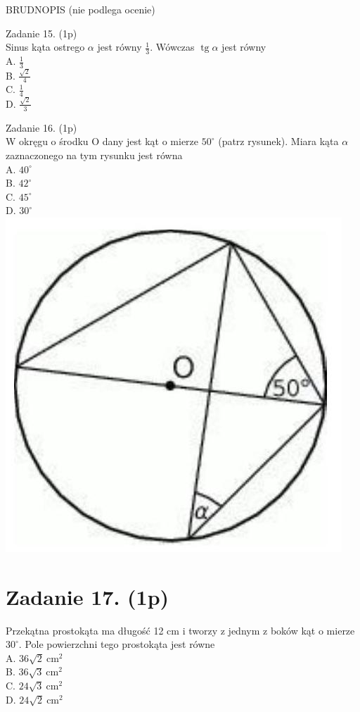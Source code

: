 \documentclass[10pt]{article}
\begin{document}
BRUDNOPIS (nie podlega ocenie)

Zadanie 15. (1p)\\
Sinus kąta ostrego \(\alpha\) jest równy \(\frac{1}{3}\). Wówczas \(\operatorname{tg} \alpha\) jest równy\\
A. \(\frac{1}{3}\)\\
B. \(\frac{\sqrt{2}}{4}\)\\
C. \(\frac{1}{4}\)\\
D. \(\frac{\sqrt{2}}{3}\)

Zadanie 16. (1p)\\
W okręgu o środku O dany jest kąt o mierze \(50^{\circ}\) (patrz rysunek). Miara kąta \(\alpha\) zaznaczonego na tym rysunku jest równa\\
A. \(40^{\circ}\)\\
B. \(42^{\circ}\)\\
C. \(45^{\circ}\)\\
D. \(30^{\circ}\)\\
\includegraphics[max width=\textwidth, center]{2024_11_21_19ede52d758866b0d67eg-06}

\section*{Zadanie 17. (1p)}
Przekątna prostokąta ma długość 12 cm i tworzy z jednym z boków kąt o mierze \(30^{\circ}\). Pole powierzchni tego prostokąta jest równe\\
A. \(36 \sqrt{2} \mathrm{~cm}^{2}\)\\
B. \(36 \sqrt{3} \mathrm{~cm}^{2}\)\\
C. \(24 \sqrt{3} \mathrm{~cm}^{2}\)\\
D. \(24 \sqrt{2} \mathrm{~cm}^{2}\)
\end{document}
